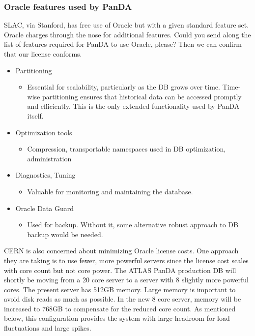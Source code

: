 \subsubsection{Oracle features used by PanDA}
SLAC, via Stanford, has free use of Oracle but with a given standard feature set. Oracle charges through the nose for additional features. Could you send along the list of features required for PanDA to use Oracle, please? Then we can confirm that our license conforms.


\begin{itemize}
\item Partitioning
\begin{itemize}
\item Essential for scalability, particularly as the DB grows over time. Time-wise partitioning ensures that historical data can be accessed promptly and efficiently. This is the only extended functionality used by PanDA itself.
\end{itemize}
\item Optimization tools
\begin{itemize}
\item Compression, transportable namespaces used in DB optimization, administration
\end{itemize}
\item Diagnostics, Tuning
\begin{itemize}
\item Valuable for monitoring and maintaining the database.
\end{itemize}
\item Oracle Data Guard
\begin{itemize}
\item Used for backup. Without it, some alternative robust approach to DB backup would be needed.
\end{itemize}
\end{itemize}

CERN is also concerned about minimizing Oracle license costs. One approach they are taking is to use fewer, more powerful servers since the license cost scales with core count but not core power. The ATLAS PanDA production DB will shortly be moving from a 20 core server to a server with 8 slightly more powerful cores. The present server has 512GB memory. Large memory is important to avoid disk reads as much as possible. In the new 8 core server, memory will be increased to 768GB to compensate for the reduced core count. As mentioned below, this configuration provides the system with large headroom for load fluctuations and large spikes.

